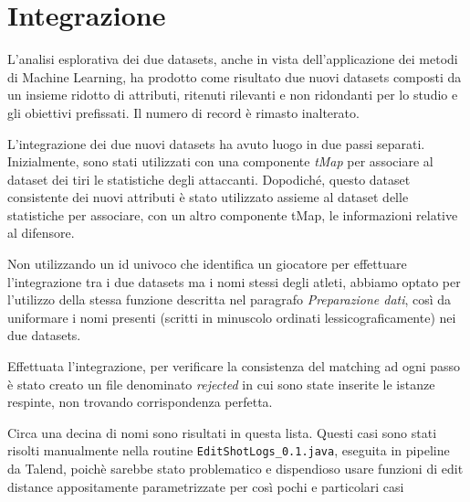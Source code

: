 \section{Integrazione}

L’analisi esplorativa dei due datasets, anche in vista dell’applicazione dei metodi di Machine Learning, ha prodotto come risultato due nuovi datasets composti da un insieme ridotto di attributi, ritenuti rilevanti e non ridondanti per lo studio e gli obiettivi prefissati. Il numero di record è rimasto inalterato.
\par
L’integrazione dei due nuovi datasets ha avuto luogo in due passi separati. Inizialmente, sono stati utilizzati con una componente \textit{tMap} per associare al dataset dei tiri le statistiche degli attaccanti. Dopodiché, questo dataset consistente dei nuovi attributi è stato utilizzato assieme al dataset delle statistiche per associare, con un altro componente tMap, le informazioni relative al difensore.
\par
Non utilizzando un id univoco che identifica un giocatore per effettuare l’integrazione tra i due datasets ma i nomi stessi degli atleti, abbiamo optato per l’utilizzo della stessa funzione descritta nel paragrafo \textit{Preparazione dati}, così da uniformare i nomi presenti (scritti in minuscolo ordinati lessicograficamente) nei due datasets. 
\par
Effettuata l’integrazione, per verificare la consistenza del matching ad ogni passo è stato creato un file denominato \textit{rejected} in cui sono state inserite le istanze respinte, non trovando corrispondenza perfetta.
\par
Circa una decina di nomi sono risultati in questa lista. Questi casi sono stati risolti manualmente nella routine \texttt{EditShotLogs\_0.1.java}, eseguita in pipeline da Talend, poichè sarebbe stato problematico e dispendioso usare funzioni di edit distance appositamente parametrizzate per così pochi e particolari casi

